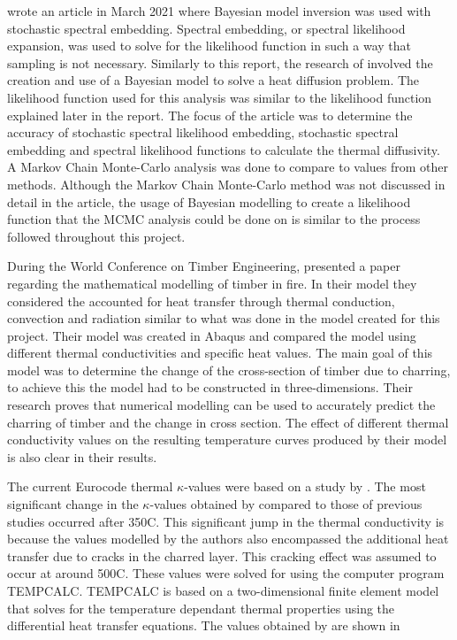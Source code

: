 \citeauthor{Wagner:2021} wrote an article in March 2021 where Bayesian model inversion was used with stochastic spectral embedding.
Spectral embedding, or spectral likelihood expansion, was used to solve for the likelihood function in such a way that sampling is not necessary.
Similarly to this report, the research of \citet{Wagner:2021} involved the creation and use of a Bayesian model to solve a heat diffusion problem.
The likelihood function used for this analysis was similar to the likelihood function explained later in the report.
The focus of the article was to determine the accuracy of stochastic spectral likelihood embedding, stochastic spectral embedding and spectral likelihood functions to calculate the thermal diffusivity.
A Markov Chain Monte-Carlo analysis was done to compare to values from other methods.
Although the Markov Chain Monte-Carlo method was not discussed in detail in the article, the usage of Bayesian modelling to create a likelihood function that the MCMC analysis could be done on is similar to the process followed throughout this project.

During the World Conference on Timber Engineering, \citet{Thi:2016} presented a paper regarding the mathematical modelling of timber in fire. 
In their model they considered the accounted for heat transfer through thermal conduction, convection and radiation similar to what was done in the model created for this project.
Their model was created in Abaqus and compared the model using different thermal conductivities and specific heat values.
The main goal of this model was to determine the change of the cross-section of timber due to charring, to achieve this the model had to be constructed in three-dimensions.
Their research proves that numerical modelling can be used to accurately predict the charring of timber and the change in cross section.
The effect of different thermal conductivity values on the resulting temperature curves produced by their model is also clear in their results.


The current Eurocode thermal $\kappa$-values were based on a study by \citet{Koning:1999}.
The most significant change in the $\kappa$-values obtained by \citeauthor{Koning:1999} compared to those of previous studies occurred after 350\textdegree C. 
This significant jump in the thermal conductivity is because the values modelled by the authors also encompassed the additional heat transfer due to cracks in the charred layer.
This cracking effect was assumed to occur at around 500\textdegree C.
These values were solved for using the computer program TEMPCALC.
TEMPCALC is based on a two-dimensional finite element model that solves for the temperature dependant thermal properties using the differential heat transfer equations.
The values obtained by \citeauthor{Koning:1999} are shown in

